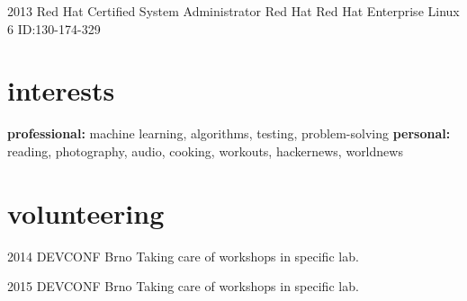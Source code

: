 \documentclass[]{friggeri-cv} %
\begin{document}
\begin{entrylist}


\entry
{2013}
{Red Hat Certified System Administrator}
{Red Hat}
{Red Hat Enterprise Linux 6 ID:130-174-329}


\end{entrylist}


\section{interests}

\textbf{professional:} machine learning, algorithms, testing, problem-solving \textbf{personal:} reading, photography, audio, cooking, workouts, hackernews, worldnews


\section{volunteering}

\begin{entrylist}

\entry
{2014}
{DEVCONF}
{Brno}
{Taking care of workshops in specific lab.}

\entry
{2015}
{DEVCONF}
{Brno}
{Taking care of workshops in specific lab.}

\end{entrylist}

\end{document}
